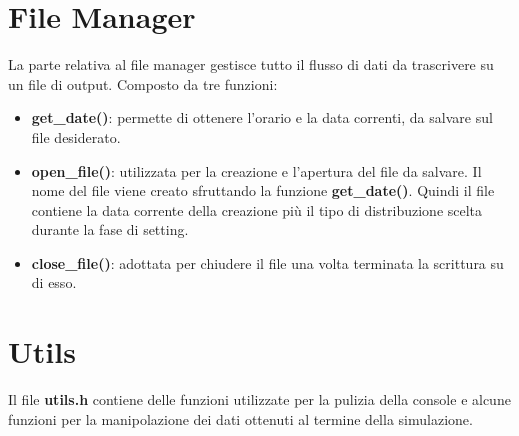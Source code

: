 \section{File Manager}
La parte relativa al file manager gestisce tutto il flusso di dati da 
trascrivere  su un file di output. Composto da tre funzioni:
\begin{itemize}
\item \textbf{get\_date()}: permette di ottenere l'orario e la data correnti, 
da 
salvare sul file desiderato.
\item \textbf{open\_file()}: utilizzata per la creazione e l'apertura 
del file da salvare. Il nome del file viene creato sfruttando la funzione 
\textbf{get\_date()}. Quindi il file contiene la data corrente della creazione pi\`u il 
tipo di 
distribuzione scelta durante la fase di setting.
\item \textbf{close\_file()}: adottata per chiudere il file una volta 
terminata la scrittura su di esso.
\end{itemize}

\section{Utils}
Il file \textbf{utils.h} contiene delle funzioni utilizzate per la pulizia della 
console 
e alcune funzioni per la manipolazione dei dati ottenuti al termine della 
simulazione.

